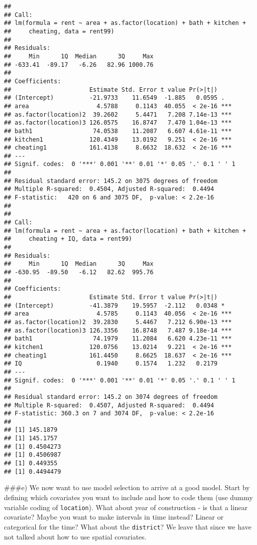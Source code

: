 \documentclass[]{article}
\begin{document}
\begin{verbatim}
## 
## Call:
## lm(formula = rent ~ area + as.factor(location) + bath + kitchen + 
##     cheating, data = rent99)
## 
## Residuals:
##     Min      1Q  Median      3Q     Max 
## -633.41  -89.17   -6.26   82.96 1000.76 
## 
## Coefficients:
##                      Estimate Std. Error t value Pr(>|t|)    
## (Intercept)          -21.9733    11.6549  -1.885   0.0595 .  
## area                   4.5788     0.1143  40.055  < 2e-16 ***
## as.factor(location)2  39.2602     5.4471   7.208 7.14e-13 ***
## as.factor(location)3 126.0575    16.8747   7.470 1.04e-13 ***
## bath1                 74.0538    11.2087   6.607 4.61e-11 ***
## kitchen1             120.4349    13.0192   9.251  < 2e-16 ***
## cheating1            161.4138     8.6632  18.632  < 2e-16 ***
## ---
## Signif. codes:  0 '***' 0.001 '**' 0.01 '*' 0.05 '.' 0.1 ' ' 1
## 
## Residual standard error: 145.2 on 3075 degrees of freedom
## Multiple R-squared:  0.4504, Adjusted R-squared:  0.4494 
## F-statistic:   420 on 6 and 3075 DF,  p-value: < 2.2e-16
## 
## 
## Call:
## lm(formula = rent ~ area + as.factor(location) + bath + kitchen + 
##     cheating + IQ, data = rent99)
## 
## Residuals:
##     Min      1Q  Median      3Q     Max 
## -630.95  -89.50   -6.12   82.62  995.76 
## 
## Coefficients:
##                      Estimate Std. Error t value Pr(>|t|)    
## (Intercept)          -41.3879    19.5957  -2.112   0.0348 *  
## area                   4.5785     0.1143  40.056  < 2e-16 ***
## as.factor(location)2  39.2830     5.4467   7.212 6.90e-13 ***
## as.factor(location)3 126.3356    16.8748   7.487 9.18e-14 ***
## bath1                 74.1979    11.2084   6.620 4.23e-11 ***
## kitchen1             120.0756    13.0214   9.221  < 2e-16 ***
## cheating1            161.4450     8.6625  18.637  < 2e-16 ***
## IQ                     0.1940     0.1574   1.232   0.2179    
## ---
## Signif. codes:  0 '***' 0.001 '**' 0.01 '*' 0.05 '.' 0.1 ' ' 1
## 
## Residual standard error: 145.2 on 3074 degrees of freedom
## Multiple R-squared:  0.4507, Adjusted R-squared:  0.4494 
## F-statistic: 360.3 on 7 and 3074 DF,  p-value: < 2.2e-16
## 
## [1] 145.1879
## [1] 145.1757
## [1] 0.4504273
## [1] 0.4506987
## [1] 0.449355
## [1] 0.4494479
\end{verbatim}

\#\#\#e) We now want to use model selection to arrive at a good model.
Start by defining which covariates you want to include and how to code
them (use dummy variable coding of \texttt{location}). What about year
of construction - is that a linear covariate? Maybe you want to make
intervals in time instead? Linear or categorical for the time? What
about the \texttt{district}? We leave that since we have not talked
about how to use spatial covariates.
\end{document}
